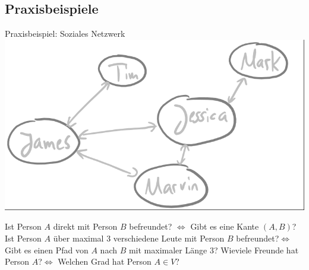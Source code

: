 \subsection{Praxisbeispiele}

\begin{frame}{Praxisbeispiel: Soziales Netzwerk}
	\ip\includegraphics[scale=0.4]{images/graph_beispiel_socialnetwork.png}
	\begin{itemize}
		\pitem Ist Person $A$ direkt mit Person $B$ befreundet? \pause $\Leftrightarrow$ Gibt es eine Kante $(A,B)$?
		\pitem Ist Person $A$ über maximal 3 verschiedene Leute mit Person $B$ befreundet?\pause $\Leftrightarrow$  Gibt es einen Pfad von $A$ nach $B$ mit maximaler Länge 3?
		\pitem Wieviele Freunde hat Person $A$?\pause $\Leftrightarrow$ Welchen Grad hat Person $A \in V$?
	\end{itemize}
\end{frame}

